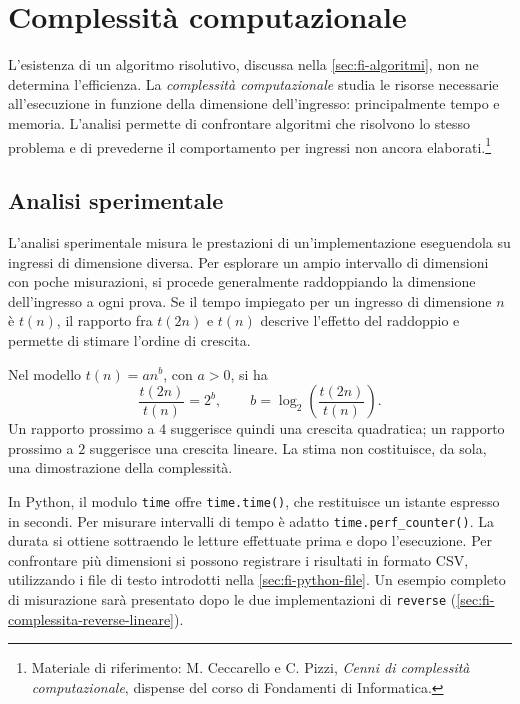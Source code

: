 \chapter{Complessità computazionale}
\label{chap:complessita}

L'esistenza di un algoritmo risolutivo, discussa nella
\cref{sec:fi-algoritmi}, non ne determina l'efficienza. La
\emph{complessità computazionale} studia le risorse necessarie
all'esecuzione in funzione della dimensione dell'ingresso: principalmente
tempo e memoria. L'analisi permette di confrontare algoritmi che
risolvono lo stesso problema e di prevederne il comportamento per
ingressi non ancora elaborati.\footnote{Materiale di riferimento:
M. Ceccarello e C. Pizzi, \emph{Cenni di complessità
computazionale}, dispense del corso di Fondamenti di Informatica.}

\section{Analisi sperimentale}
\label{sec:fi-complessita-sperimentale}

L'analisi sperimentale misura le prestazioni di un'implementazione
eseguendola su ingressi di dimensione diversa. Per esplorare un ampio
intervallo di dimensioni con poche misurazioni, si procede generalmente
raddoppiando la dimensione dell'ingresso a ogni prova. Se il tempo
impiegato per un ingresso di dimensione \(n\) è \(t(n)\), il rapporto
fra \(t(2n)\) e \(t(n)\) descrive l'effetto del raddoppio e permette
di stimare l'ordine di crescita.

Nel modello \(t(n)=an^b\), con \(a>0\), si ha
\[
  \frac{t(2n)}{t(n)}=2^b,
  \qquad
  b=\log_2\!\left(\frac{t(2n)}{t(n)}\right).
\]
Un rapporto prossimo a \(4\) suggerisce quindi una crescita quadratica;
un rapporto prossimo a \(2\) suggerisce una crescita lineare. La
stima non costituisce, da sola, una dimostrazione della complessità.

In Python, il modulo \texttt{time} offre \texttt{time.time()}, che
restituisce un istante espresso in secondi. Per misurare intervalli di
tempo è adatto \texttt{time.perf\_counter()}. La durata si ottiene sottraendo le letture effettuate prima e
dopo l'esecuzione. Per confrontare più dimensioni si possono registrare
i risultati in formato CSV, utilizzando i file di testo introdotti
nella \cref{sec:fi-python-file}. Un esempio completo di misurazione
sarà presentato dopo le due implementazioni di \texttt{reverse} (\cref{sec:fi-complessita-reverse-lineare}).

